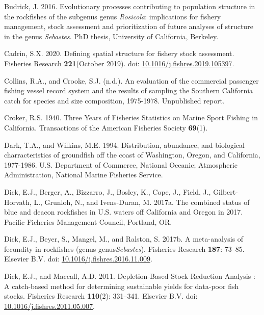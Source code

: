 \documentclass[
  english,
  a4paper,
]{article}
\newlength{\cslhangindent}
\newlength{\cslentryspacingunit} %
\newenvironment{CSLReferences}[2] %
 {%
  \setlength{\parindent}{0pt}
  \ifodd #1
  \let\oldpar\par
  \def\par{\hangindent=\cslhangindent\oldpar}
  \fi
  \setlength{\parskip}{#2\cslentryspacingunit}
 }%
 {}
\begin{document}
\begin{CSLReferences}{1}{0}
\leavevmode{}%
Budrick, J. 2016. {Evolutionary processes contributing to population structure in the rockfishes of the subgenus genus \emph{Rosicola}: implications for fishery management, stock assessment and prioritization of future analyses of structure in the genus \emph{Sebastes}.} PhD thesis, University of California, Berkeley.

\leavevmode{}%
Cadrin, S.X. 2020. {Defining spatial structure for fishery stock assessment}. Fisheries Research \textbf{221}(October 2019). doi: \href{https://doi.org/10.1016/j.fishres.2019.105397}{10.1016/j.fishres.2019.105397}.

\leavevmode{}%
Collins, R.A., and Crooke, S.J. (n.d.). {An evaluation of the commercial passenger fishing vessel record system and the results of sampling the Southern California catch for species and size composition, 1975-1978}. Unpublished report.

\leavevmode{}%
Croker, R.S. 1940. {Three Years of Fisheries Statistics on Marine Sport Fishing in California}. Transactions of the American Fisheries Society \textbf{69}(1).

\leavevmode{}%
Dark, T.A., and Wilkins, M.E. 1994. {Distribution, abundance, and biological charracteristics of groundfish off the coast of Washington, Oregon, and California, 1977-1986}. U.S. Department of Commerce, National Oceanic; Atmospheric Administration, National Marine Fisheries Service.

\leavevmode{}%
Dick, E.J., Berger, A., Bizzarro, J., Bosley, K., Cope, J., Field, J., Gilbert-Horvath, L., Grunloh, N., and Ivens-Duran, M. 2017a. {The combined status of blue and deacon rockfishes in U.S. waters off California and Oregon in 2017}. Pacific Ficheries Management Council, Portland, OR.

\leavevmode{}%
Dick, E.J., Beyer, S., Mangel, M., and Ralston, S. 2017b. {A meta-analysis of fecundity in rockfishes (genus genus\emph{Sebastes})}. Fisheries Research \textbf{187}: 73--85. Elsevier B.V. doi: \href{https://doi.org/10.1016/j.fishres.2016.11.009}{10.1016/j.fishres.2016.11.009}.

\leavevmode{}%
Dick, E.J., and Maccall, A.D. 2011. {Depletion-Based Stock Reduction Analysis : A catch-based method for determining sustainable yields for data-poor fish stocks}. Fisheries Research \textbf{110}(2): 331--341. Elsevier B.V. doi: \href{https://doi.org/10.1016/j.fishres.2011.05.007}{10.1016/j.fishres.2011.05.007}.


\end{CSLReferences}
\end{document}
